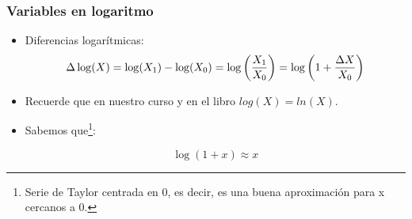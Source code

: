 \documentclass{beamer}
\begin{document}
\begin{frame}[shrink=10]
\end{frame}

\begin{frame}
\frametitle{Variables en logaritmo}

\begin{itemize}
    \item Diferencias logarítmicas:
    \[
    \Delta \log(X)= \log(X_1)-\log(X_0)= \log\left (\frac{ X_1}{X_0}\right )=\log\left(1+{\Delta X\over X_0} \right)
    \]
    \item Recuerde que en nuestro curso y en el libro $log(X)=ln(X)$.
    \item Sabemos que\footnote{Serie de Taylor centrada en 0, es decir, es una buena aproximación para x cercanos a 0.}:

    \[
    \log(1+x) \approx x
    \]
    
\end{itemize}



\end{frame}
\end{document}
